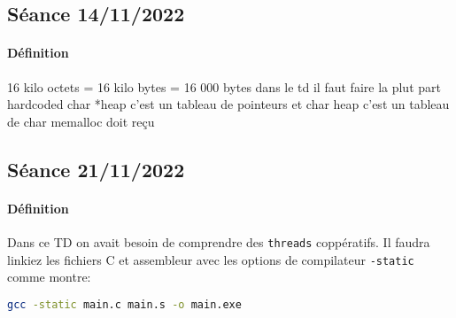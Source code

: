 \documentclass{article}
\begin{document}
\subsection{Séance 14/11/2022}
\paragraph{Définition}16 kilo octets = 16 kilo bytes = 16 000 bytes
dans le td il faut faire la plut part hardcoded
char *heap c'est un tableau de pointeurs et char heap c'est un tableau de char
memalloc doit reçu

\newpage\subsection{Séance 21/11/2022}
\paragraph{Définition}Dans ce TD on avait besoin de comprendre des \texttt{threads} coppératifs. Il faudra linkiez les fichiers C et assembleur avec les options de compilateur \texttt{-static} comme montre:
\begin{scriptsize}\mycode
    \begin{lstlisting}[language=Bash]
        gcc -static main.c main.s -o main.exe
    \end{lstlisting}
\end{scriptsize}
\end{document}
